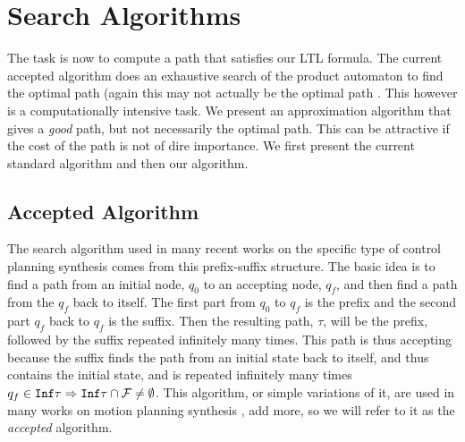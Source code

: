 \section{Search Algorithms}
The task is now to compute a path that satisfies our LTL formula. The current accepted algorithm does an exhaustive search of the product automaton to find the optimal path (again this may not actually be the optimal path \cite{schuppan05}. This however is a computationally intensive task. We present an approximation algorithm that gives a \textit{good} path, but not necessarily the optimal path. This can be attractive if the cost of the path is not of dire importance. We first present the current standard algorithm and then our algorithm. 
\subsection{Accepted Algorithm}
The search algorithm used in many recent works on the specific type of control planning synthesis comes from this prefix-suffix structure. The basic idea is to find a path from an initial node, $q_0$ to an accepting node, $q_f$, and then find a path from the $q_f$ back to itself. The first part from $q_0$ to $q_f$ is the prefix and the second part $q_f$ back to $q_f$ is the suffix. Then the resulting path, $\tau$, will be the prefix, followed by the suffix repeated infinitely many times. This path is thus accepting because the suffix finds the path from an initial state back to itself, and thus contains the initial state, and is repeated infinitely many times $q_f \in \texttt{Inf} \tau  \Rightarrow \texttt{Inf} \tau \cap \mathcal{F} \neq \emptyset$. This algorithm, or simple variations of it, are used in many works on motion planning synthesis \cite{fainekos09}, add more, so we will refer to it as the \textit{accepted} algorithm. 


